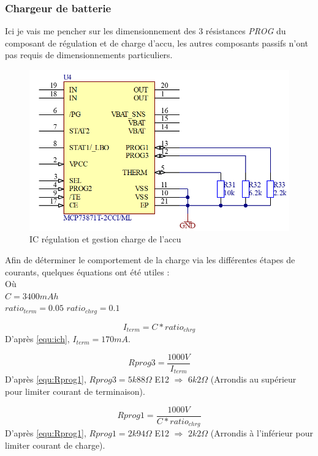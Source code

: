 {	\clearpage
	\subsubsection{Chargeur de batterie} \label{sssec:BatCharger}
	{
		Ici je vais me pencher sur les dimensionnement des 3 résistances \textit{PROG} du composant de régulation et de charge d'accu, les autres composants passifs n'ont pas requis de dimensionnements particuliers.
		\begin{figure}[h]
			\centering
			\includegraphics[width=0.55\linewidth]{Figures/Dev-SCH/ChargeBat}
			\caption{IC régulation et gestion charge de l'accu}
			\label{fig:chargebat}
		\end{figure}
		
		Afin de déterminer le comportement de la charge via les différentes étapes de courants, quelques équations ont été utiles : \\
		Où \\
		$C = 3400mAh$ \\
		$ratio_{term} = 0.05$
		$ratio_{chrg} = 0.1$
		
		\begin{equation} \label{equ:ich}
			I_{term} = C * ratio_{chrg} 
		\end{equation}
		D'après \ref{equ:ich}, $I_{term} = 170mA$.
	 
	 	\begin{equation} \label{equ:Rprog3}
		 	Rprog3 = \frac{1000V}{I_{term}}
		\end{equation}
		D'après \ref{equ:Rprog1}, $Rprog3 = 5k88 \Omega$ E12 $\Longrightarrow$ $6k2\Omega$ (Arrondis au supérieur pour limiter courant de terminaison).
		
		\begin{equation} \label{equ:Rprog1}
			Rprog1 = \frac{1000V}{C * ratio_{chrg}} 
		\end{equation}
		D'après \ref{equ:Rprog1}, $Rprog1 = 2k94 \Omega$ E12 $\Longrightarrow$ $2k2\Omega$ (Arrondis à l'inférieur pour limiter courant de charge).
		 
	}
	
}
